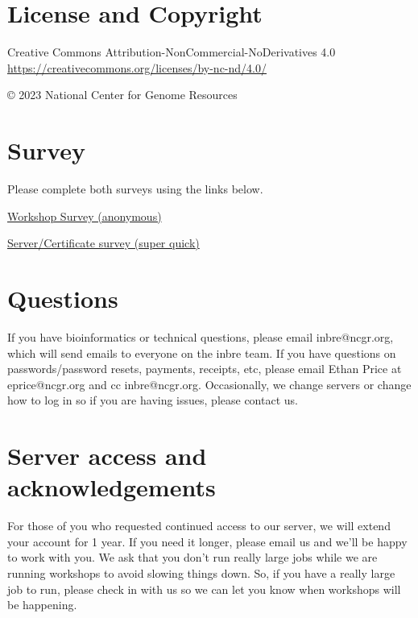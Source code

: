 \documentclass[
]{book}
\begin{document}
\hypertarget{license-and-copyright-1}{%
\section*{License and Copyright}\label{license-and-copyright-1}}

Creative Commons Attribution-NonCommercial-NoDerivatives 4.0
\url{https://creativecommons.org/licenses/by-nc-nd/4.0/}

© 2023 National Center for Genome Resources

\hypertarget{survey}{%
\section*{Survey}\label{survey}}

Please complete both surveys using the links below.

\href{https://docs.google.com/forms/d/e/1FAIpQLScjtEvK-ywP9DEbTNsIcIn4YMe9evXvhmp-NVzn-t4MSakXig/viewform?usp=sf_link}{Workshop Survey (anonymous)}

\href{https://docs.google.com/forms/d/e/1FAIpQLSfGZwX2BL_ZyGgmvh4v41Q_886y-OiTESTbpvzoyR0J3BxC5Q/viewform?usp=sf_link}{Server/Certificate survey (super quick)}

\hypertarget{questions}{%
\section*{Questions}\label{questions}}

If you have bioinformatics or technical questions, please email inbre@ncgr.org, which will send emails to everyone on the inbre team. If you have questions on passwords/password resets, payments, receipts, etc, please email Ethan Price at eprice@ncgr.org and cc inbre@ncgr.org. Occasionally, we change servers or change how to log in so if you are having issues, please contact us.

\hypertarget{server-access-and-acknowledgements}{%
\section*{Server access and acknowledgements}\label{server-access-and-acknowledgements}}

For those of you who requested continued access to our server, we will extend your account for 1 year. If you need it longer, please email us and we'll be happy to work with you. We ask that you don't run really large jobs while we are running workshops to avoid slowing things down. So, if you have a really large job to run, please check in with us so we can let you know when workshops will be happening.
\end{document}
